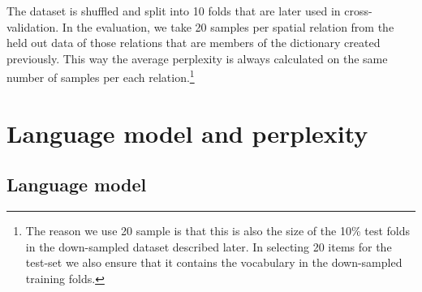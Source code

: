 The dataset is shuffled and split into 10 folds that are later used in cross-validation.
In the evaluation, we take 20 samples per spatial relation from the held out data of those relations that are members of the dictionary created previously. This way the average perplexity is always calculated on the same number of samples per each relation.\footnote{The reason we use 20 sample is that this is also the size of the 10\% test folds in the down-sampled dataset described later. In selecting 20 items for the test-set we also ensure that it contains the vocabulary in the down-sampled training folds.}








\section{Language model and perplexity}\label{splu2018:sec:lm-perplexity}

\subsection{Language model}\label{splu2018:sec:lm-description}


